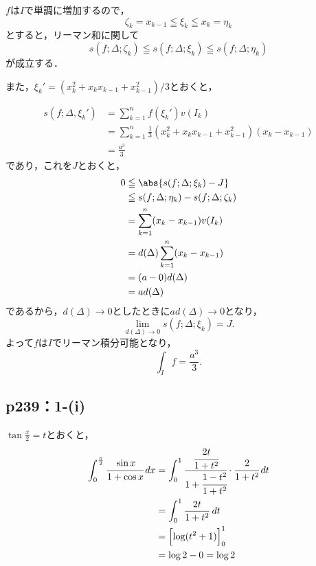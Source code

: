\documentclass[uplatex,dvipdfmx,a4paper,10pt,fleqn]{jsarticle}
\begin{document}
        \begin{tleftbar}
            $f$は$I$で単調に増加するので，
            \[
            \zeta_k = x_{k-1} \leqq \xi_k \leqq x_k=\eta_k 
            \]
            とすると，リーマン和に関して
            \[
            s(f;\Delta ; \zeta_k ) \leqq s(f;\Delta;\xi_k) \leqq s(f;\Delta;\eta_k)
            \]
            が成立する．
            
            また，$\xi_k' = (x_k ^2 + x_k x_{k-1}+x_{k-1} ^2)/3 $とおくと，
            
            \begin{align*}
            s(f;\Delta,\xi_k' )& = \sum_{k=1}^{n} f(\xi_k ') v(I_k) \\
            & =  \sum_{k=1}^{n} \frac{1}{3} (x_k ^2 + x_k x_{k-1}+x_{k-1} ^2)(x_k - x_{k-1}) \\
            & = \frac{a^3}{3}
            \end{align*}
            であり，これを$J$とおくと，
            \begin{align*} 
            0 &\leqq \abs{s(f;\Delta; \xi_k)-J }\\
            & \leqq  s(f;\Delta;\eta_k) -s(f;\Delta ; \zeta_k ) \\
            & = \sum_{k=1}^{n} (x_k-x_{k-1} ) v(I_k) \\
            & = d(\Delta) \sum_{k=1}^{n} (x_k-x_{k-1} ) \\
            & = (a-0) d(\Delta)\\
            & =a d(\Delta)
            \end{align*}
            であるから，$d (\Delta) \to 0$としたときに$a d(\Delta) \to 0$となり，
            \[
            \lim_{d(\Delta) \to 0} s(f;\Delta; \xi_k)=J.
            \]
            よって$f$は$I$でリーマン積分可能となり，
            \[
            \int_{I} f = \frac{a^3}{3}.
            \]
            \end{tleftbar}

\subsection*{p239：1-(i)}

\begin{screen}
	 $\tan \frac{x}{2}=t$とおくと，
	\begin{align*}
		\int_{0}^{\frac{\pi}{2}} \cfrac{\sin x}{1+\cos x} \, dx & = \int_{0}^{1} \cfrac{\cfrac{2t}{1+t^2}}{1+\cfrac{1-t^2}{1+t^2}} \cdot \cfrac{2}{1+t^2} \, dt \\
		& = \int_{0}^{1} \frac{2t}{1+t^2} \, dt \\
		& = \Bigl[\log (t^2+1)\Bigl]_{0}^{1} \\
		& = \log 2-0 = \log 2
	\end{align*}
\end{screen}
\end{document}

